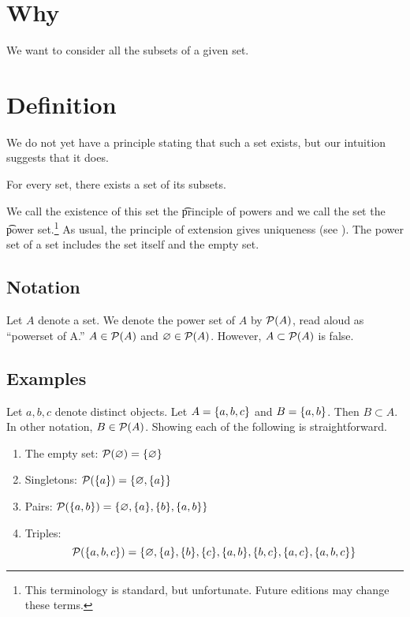 
\section*{Why}

We want to consider all the subsets of a given set.

\section*{Definition}

We do not yet have a principle stating that such a set exists, but our intuition suggests that it does.

\begin{principle}[powers]
For every set, there exists a set of its subsets.
\end{principle}

We call the existence of this set the \t{principle of powers} and we call the set the \t{power set}.\footnote{This terminology is standard, but unfortunate. Future editions may change these terms.}
As usual, the principle of extension gives uniqueness (see ).
The power set of a set includes the set itself and the empty set.

\subsection*{Notation}

Let $A$ denote a set.
We denote the power set of $A$ by $\mathcal{P}(A)$, read aloud as ``powerset of A.''
$A \in \mathcal{P}(A)$ and $\varnothing \in \mathcal{P}(A)$.
However, $A \subset \mathcal{P}(A)$ is false.

\subsection*{Examples}

Let $a, b, c$ denote distinct objects. Let $A = \{a, b ,c\}$
and $B = \{a, b\}$. Then
$B \subset A$.
In other notation,
$B \in \mathcal{P}(A)$.
Showing each of the following is straightforward.
  \begin{enumerate}
    \item The empty set: $\mathcal{P}(\varnothing) = \{\varnothing\}$
    \item Singletons: $\mathcal{P}(\{a\}) = \{\varnothing, \{a\}\}$
    \item Pairs: $\mathcal{P}(\{a, b\}) = \{\varnothing, \{a\}, \{b\}, \{a, b\}\}$
    \item Triples:
\[
\mathcal{P}(\{a, b, c\}) =
\{
\varnothing,
\{a\},
\{b\},
\{c\},
\{a, b\},
\{b, c\},
\{a, c\},
\{a, b, c\}
\}
\]
  \end{enumerate}


